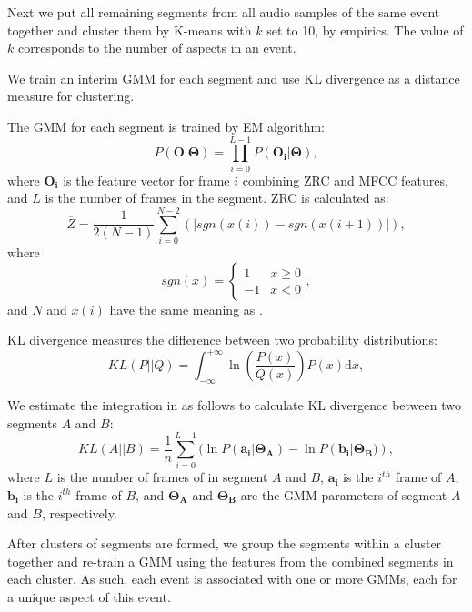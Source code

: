 Next we put all remaining segments from all audio samples of 
the same event together and cluster them by K-means with $k$ set to 10, by
empirics. The value of $k$ corresponds to the number of aspects in an event.

We train an interim GMM for each segment and use KL divergence 
\cite{kullback51:KL} as 
a distance measure for clustering.

The GMM for each segment is trained by EM algorithm: 
\begin{equation}
\label{eqn:pp}
P(\mathbf{O}|\mathbf{\Theta}) = \prod_{i=0}^{L - 1}
P(\mathbf{O_i}|\mathbf{\Theta}),
\end{equation}
where $\mathbf{O_i}$ is the feature vector for frame $i$ combining
ZRC and MFCC features, and $L$ is the number of frames in the segment. 
ZRC is calculated as:
\begin{equation}
\overline{Z} = \frac{1}{2(N - 1)}\sum_{i=0}^{N-2}(|sgn(x(i)) - sgn(x(i + 1))|),
\end{equation}
where
\begin{equation}
sgn(x) = \left\{\begin{array}{ll} 1 & x\geq 0\\ -1 & x < 0\end{array}\right.,
\end{equation}
and $N$ and $x(i)$ have the same meaning as .

KL divergence measures the difference between two probability distributions:
\begin{equation}
KL(P||Q) = \int_{-\infty}^{+\infty}\ln(\frac{P(x)}{Q(x)})P(x)\mathrm{d}x,
\label{eqn:kl}
\end{equation}

We estimate the integration in  as follows to calculate 
KL divergence between two segments $A$ and $B$:
\begin{equation}
KL(A||B) = \frac{1}{n}\sum_{i=0}^{L-1}(\ln P(\mathbf{a_i}|\mathbf{\Theta_A}) 
- \ln P(\mathbf{b_i}|\mathbf{\Theta_B)}),
\end{equation}
where $L$ is the number of frames of in segment $A$ and $B$, 
$\mathbf{a_i}$ is the $i^{th}$ frame of $A$, 
$\mathbf{b_i}$ is the $i^{th}$ frame of $B$, and 
$\mathbf{\Theta_A}$ and $\mathbf{\Theta_B}$ are the GMM parameters of 
segment $A$ and $B$, respectively.

After clusters of segments are formed, we group the segments within a cluster
together and re-train a GMM using the features from the combined segments in 
each cluster. As such, each event is associated with one or more
GMMs, each for a unique aspect of this event.

